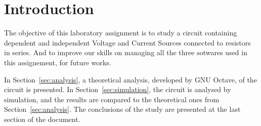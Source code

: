 \section{Introduction}
\label{sec:introduction}


The objective of this laboratory assignment is to study a circuit containing dependent and independent Voltage and Current Sources connected to resistors in series. And to improve our skills on managing all the three sotwares used in this assignement, for future works.
\vspace{1cm}


In Section~\ref{sec:analysis}, a theoretical analysis, developed by GNU Octave, of the circuit is presented. In Section~\ref{sec:simulation}, the circuit is analysed by
simulation, and the results are compared to the theoretical ones from
Section~\ref{sec:analysis}. The conclusions of the study are presented at the last section of the document.
